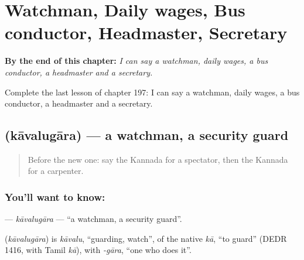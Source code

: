 
\chapter{Watchman, Daily wages, Bus conductor, Headmaster, Secretary}
\label{ch:ka-watchman-daily-wages-bus-conductor-headmaster-secretary}

\begin{chapteropening}
\textbf{By the end of this chapter:} \emph{I can say a watchman, daily wages, a bus conductor, a headmaster and a secretary.}

Complete the last lesson of chapter 197: I can say a watchman, daily wages, a bus conductor, a headmaster and a secretary.
\end{chapteropening}

\section[\texorpdfstring{\kn{ಕಾವಲುಗಾರ} (kāvalugāra)}{ಕಾವಲುಗಾರ (kāvalugāra)}]{ (kāvalugāra) — a watchman, a security guard}

\label{lesson:KA-C197-kavalugara}



\begin{quote}
Before the new one: say the Kannada for a spectator, then the Kannada for a carpenter.
\end{quote}

\subsection*{You'll want to know: }
\textbf{} — \emph{kāvalugāra} — \textquotedblleft{}a watchman, a security guard\textquotedblright{}.

\begin{cousinweb}
\textbf{} (\emph{kāvalugāra}) is \emph{kāvalu}, \textquotedblleft{}guarding, watch\textquotedblright{}, of the native \emph{kā}, \textquotedblleft{}to guard\textquotedblright{} (DEDR 1416, with Tamil \emph{kā}), with \emph{-gāra}, \textquotedblleft{}one who does it\textquotedblright{}.
\end{cousinweb}

